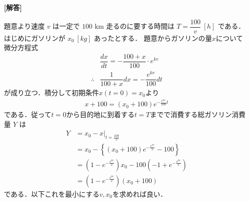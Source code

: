 \documentclass[../../main.tex]{subfiles}
\begin{document}
\begin{oframed}
  
\end{oframed}

{\bf [解答]}

題意より速度 $v$ は一定で $100 \text{ km}$ 走るのに要する時間は $T = \dfrac{100}{v} \ [h]$ である．
はじめにガソリンが $x_0 \ [kg]$ あったとする．
題意からガソリンの量$x$について微分方程式
\begin{align}
  & \dfrac{dx}{dt} = - \dfrac{100 + x}{100} \cdot e^{kv} \\
  \therefore
  & \dfrac{1}{100 + x} dx = - \dfrac{e^{kv}}{100} dt
\end{align}
が成り立つ．積分して初期条件$x(t=0)=x_0$より
\begin{align}
  x + 100 = (x_0 + 100)e^{-\frac{e^{kv}}{100}t} \label{eq:1}
\end{align}
である．従って$t=0$から目的地に到着する$t=T$までで消費する総ガソリン消費量 $Y$ は
\begin{align}
  Y
  &= x_0 - x|_{t=\frac{100}{v}} \\
  &= x_0 - \left\{ (x_0+100) e^{-\frac{e^{kv}}{v}} - 100 \right\} \\
  &= (1 - e^{-\frac{e^{kv}}{v}})x_0 - 100(-1 + e^{-\frac{e^{kv}}{v}}) \\
  &= (1 - e^{-\frac{e^{kv}}{v}})(x_0 + 100) \label{eq:2}
\end{align}
である．以下これを最小にする$v,x_0$を求めれば良い．
\end{document}
